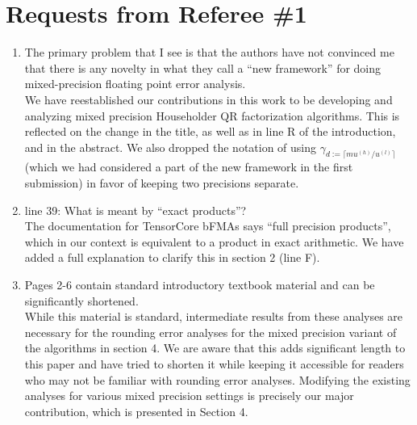 \documentclass[10pt]{article}
\begin{document}
\section*{Requests from Referee \#1}
\begin{enumerate}\bfseries
	\item The primary problem that I see is that the authors have not convinced me that there is any novelty in what they call a ``new framework'' for doing mixed-precision floating point error analysis.\\
	{\normalfont We have reestablished our contributions in this work to be developing and analyzing mixed precision Householder QR factorization algorithms.
	This is reflected on the change in the title, as well as in line R of the introduction, and in the abstract. 
	We also dropped the notation of using $\gamma_{d:=\lceil mu^{(h)}/u^{(l)}\rceil}$ (which we had considered a part of the new framework in the first submission) in favor of keeping two precisions separate.
}
	\item line 39: What is meant by ``exact products''? \\
	{\normalfont 
	The documentation for TensorCore bFMAs says ``full precision products'', which in our context is equivalent to a product in exact arithmetic.
	We have added a full explanation to clarify this in section 2 (line F). 
	}
	\item Pages 2-6 contain standard introductory textbook material and can be significantly shortened. \\
	{\normalfont
	While this material is standard, intermediate results from these analyses are necessary for the rounding error analyses for the mixed precision variant of the algorithms in section 4.
	We are aware that this adds significant length to this paper and have tried to shorten it while keeping it accessible for readers who may not be familiar with rounding error analyses.
	Modifying the existing analyses for various mixed precision settings is precisely our major contribution, which is presented in Section 4.
	}
\end{enumerate}
\end{document}
